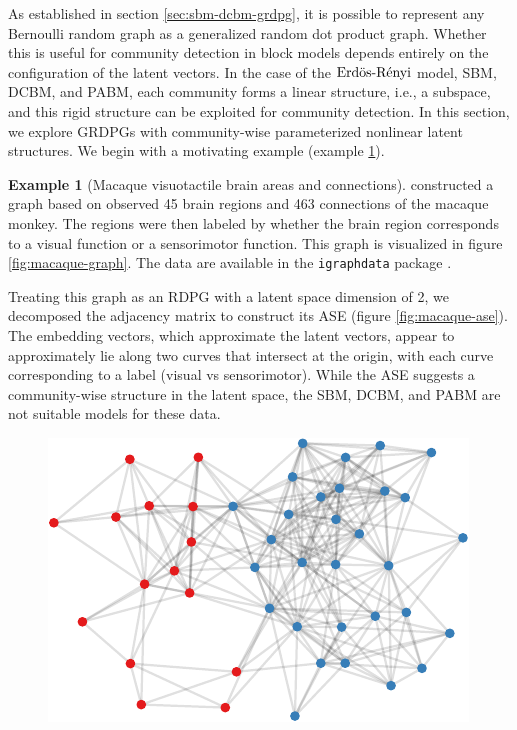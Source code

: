 \documentclass[
  12pt,
]{article}
\theoremstyle{definition}
\theoremstyle{definition}
\newtheorem{example}{Example}[section]
\theoremstyle{definition}
\theoremstyle{definition}
\theoremstyle{remark}
\begin{document}
As established in section \ref{sec:sbm-dcbm-grdpg}, it is possible to represent any Bernoulli random graph as a generalized random dot product graph.
Whether this is useful for community detection in block models depends entirely on the configuration of the latent vectors.
In the case of the \(\text{Erd\"{o}s-R\'{e}nyi}\) model, SBM, DCBM, and PABM, each community forms a linear structure, i.e., a subspace, and this rigid structure can be exploited for community detection.
In this section, we explore GRDPGs with community-wise parameterized nonlinear latent structures.
We begin with a motivating example (example \ref{ex:macaque}).

\begin{example}[Macaque visuotactile brain areas and connections]
\label{ex:macaque}
\citet{https://doi.org/10.1111/j.1460-9568.2006.04678.x} constructed a graph based on observed 45 brain regions and 463 connections of the macaque monkey. 
The regions were then labeled by whether the brain region corresponds to a visual function or a sensorimotor function. 
This graph is visualized in figure \ref{fig:macaque-graph}. 
The data are available in the \texttt{igraphdata} package \citep{igraph}. 

Treating this graph as an RDPG with a latent space dimension of 2, 
we decomposed the adjacency matrix to construct its ASE (figure \ref{fig:macaque-ase}). 
The embedding vectors, which approximate the latent vectors, appear to approximately lie along two curves that intersect at the origin, with each curve corresponding to a label (visual vs sensorimotor). 
While the ASE suggests a community-wise structure in the latent space, the SBM, DCBM, and PABM are not suitable models for these data. 

\begin{figure}[H]

{\centering \includegraphics{draft_files/figure-latex/macaque-graph-1} 

}
\end{figure}
\end{example}
\end{document}

